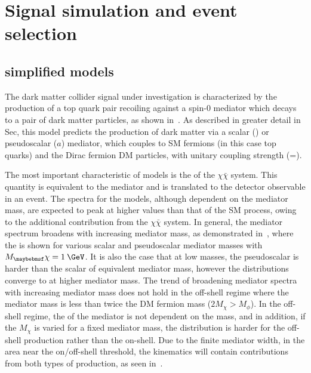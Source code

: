 \chapter{Signal simulation and event selection} 
\label{chap:signalsel}

\section{\ttDM simplified models}
\label{sec:simpmodels}

The dark matter collider signal under investigation is characterized by the production of a top quark pair recoiling against a spin-0 mediator which decays to a pair of dark matter particles, as shown in~. As described in greater detail in Sec, this model predicts the production of dark matter via a scalar (\phi) or pseudoscalar ($a$) mediator, which couples to SM fermions (in this case top quarks) and the Dirac fermion DM particles, with unitary coupling strength (\gq=). 

The most important characteristic of \ttDM models is the \pt of the $\chi\bar{\chi}$ system. This quantity is equivalent to the mediator \pt and is translated to the \ptmiss detector observable in an event. The \ptmiss spectra for the \ttDM models, although dependent on the mediator mass, are expected to peak at higher values than that of the SM \ttbar process, owing to the additional contribution from the $\chi\bar{\chi}$ system. In general, the mediator \pt spectrum broadens with increasing mediator mass, as demonstrated in~, where the \pt is shown for various scalar and pseudoscalar mediator masses with $M_\chi=1\:\GeV$. It is also the case that at low masses, the pseudoscalar \pt is harder than the scalar \pt of equivalent mediator mass, however the distributions converge to at higher mediator mass. The trend of broadening mediator \pt spectra with increasing mediator mass does not hold in the off-shell regime where the mediator mass is less than twice the DM fermion mass ($2M_\chi > M_\phi$). In the off-shell regime, the \pt of the mediator is not dependent on the mass, and in addition, if the $M_\chi$ is varied for a fixed mediator mass, the \pt distribution is harder for the off-shell production rather than the on-shell. Due to the finite mediator width, in the area near the on/off-shell threshold, the kinematics will contain contributions from both types of production, as seen in~. 

